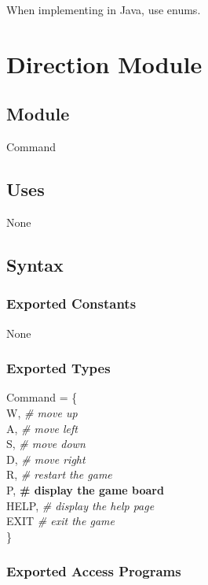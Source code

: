 \documentclass[12pt]{article}
\begin{document}
When implementing in Java, use enums.

\newpage

%

\section* {Direction Module}

\subsection*{Module}

Command

\subsection* {Uses}

None

\subsection* {Syntax}

\subsubsection* {Exported Constants}

None

\subsubsection* {Exported Types}

Command = \{\\
    W, \textit{\# move up}\\
    A, \textit{\# move left}\\
    S, \textit{\# move down}\\
    D, \textit{\# move right}\\
    R, \textit{\# restart the game}\\
    P, \textbf{\# display the game board}\\
    HELP, \textit{\# display the help page}\\
    EXIT \textit{\# exit the game}\\
\}

\subsubsection* {Exported Access Programs}
\end{document}
